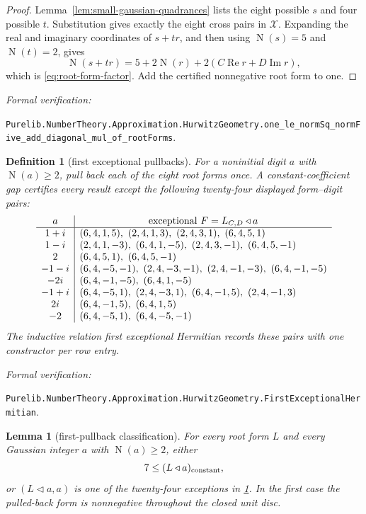 \documentclass[11pt]{article}
\newtheorem{lemma}[lemma]{Lemma}
\newtheorem{definition}[definition]{Definition}
\newcommand{\Norm}[1]{\operatorname{N}\!\left(#1\right)}
\newcommand{\leanref}[1]{\par\smallskip\noindent
  \emph{Formal verification:}\par\nobreak
  {\raggedright\nolinkurl{#1}.\par}}
\begin{document}
\begin{proof}
Lemma~\ref{lem:small-gaussian-quadrances} lists the eight possible $s$ and
four possible $t$.  Substitution gives exactly the eight cross pairs in
$\mathcal X$.  Expanding the real and imaginary coordinates of $s+tr$, and
then using $\Norm s=5$ and $\Norm t=2$, gives
\[
 \Norm{s+tr}=5+2\Norm r
      +2(C\operatorname{Re}r+D\operatorname{Im}r),
\]
which is \eqref{eq:root-form-factor}.  Add the certified nonnegative root
form to one.
\end{proof}

\leanref{Purelib.NumberTheory.Approximation.HurwitzGeometry.one_le_normSq_normFive_add_diagonal_mul_of_rootForms}

\begin{definition}[first exceptional pullbacks]
\label{def:first-exceptional-hermitian}
For a noninitial digit $a$ with $\Norm a\ge2$, pull back each of the eight
root forms once.  A constant-coefficient gap certifies every result except
the following twenty-four displayed form--digit pairs:
\[
\begin{array}{c|l}
a & \multicolumn{1}{c}{\text{exceptional }F=L_{C,D}\mathbin{\triangleleft}a}
\\ \hline
 1+i &(6,4,1,5),\ (2,4,1,3),\ (2,4,3,1),\ (6,4,5,1)\\
 1-i &(2,4,1,-3),\ (6,4,1,-5),\ (2,4,3,-1),\ (6,4,5,-1)\\
 2   &(6,4,5,1),\ (6,4,5,-1)\\
-1-i &(6,4,-5,-1),\ (2,4,-3,-1),\ (2,4,-1,-3),\ (6,4,-1,-5)\\
-2i  &(6,4,-1,-5),\ (6,4,1,-5)\\
-1+i &(6,4,-5,1),\ (2,4,-3,1),\ (6,4,-1,5),\ (2,4,-1,3)\\
 2i  &(6,4,-1,5),\ (6,4,1,5)\\
-2   &(6,4,-5,1),\ (6,4,-5,-1)
\end{array}
\]
The inductive relation \emph{first exceptional Hermitian} records these
pairs with one constructor per row entry.
\end{definition}

\leanref{Purelib.NumberTheory.Approximation.HurwitzGeometry.FirstExceptionalHermitian}

\begin{lemma}[first-pullback classification]
\label{lem:first-pullback-classification}
For every root form $L$ and every Gaussian integer $a$ with
$\Norm a\ge2$, either
\begin{equation}
\label{eq:first-pullback-gap}
                 7\le (L\mathbin{\triangleleft}a)_{\rm constant},
\end{equation}
or $(L\mathbin{\triangleleft}a,a)$ is one of the twenty-four exceptions in
\cref{def:first-exceptional-hermitian}.  In the first case the pulled-back
form is nonnegative throughout the closed unit disc.
\end{lemma}
\end{document}
